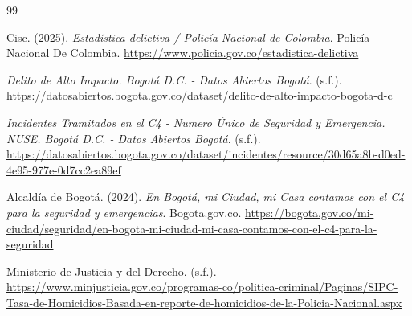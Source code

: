 \documentclass[12pt,letterpaper]{article}
\begin{document}
\begin{thebibliography}{99}
\raggedright

Cisc. (2025). \textit{Estadística delictiva / Policía Nacional de Colombia}. Policía Nacional De Colombia. \url{https://www.policia.gov.co/estadistica-delictiva}

\textit{Delito de Alto Impacto. Bogotá D.C. - Datos Abiertos Bogotá}. (s.f.). \url{https://datosabiertos.bogota.gov.co/dataset/delito-de-alto-impacto-bogota-d-c}

\textit{Incidentes Tramitados en el C4 - Numero Único de Seguridad y Emergencia. NUSE. Bogotá D.C. - Datos Abiertos Bogotá}. (s.f.). \url{https://datosabiertos.bogota.gov.co/dataset/incidentes/resource/30d65a8b-d0ed-4e95-977e-0d7cc2ea89ef}

Alcaldía de Bogotá. (2024). \textit{En Bogotá, mi Ciudad, mi Casa contamos con el C4 para la seguridad y emergencias}. Bogota.gov.co. \url{https://bogota.gov.co/mi-ciudad/seguridad/en-bogota-mi-ciudad-mi-casa-contamos-con-el-c4-para-la-seguridad}

Ministerio de Justicia y del Derecho. (s.f.). \url{https://www.minjusticia.gov.co/programas-co/politica-criminal/Paginas/SIPC-Tasa-de-Homicidios-Basada-en-reporte-de-homicidios-de-la-Policia-Nacional.aspx}

\end{thebibliography}
\end{document}
